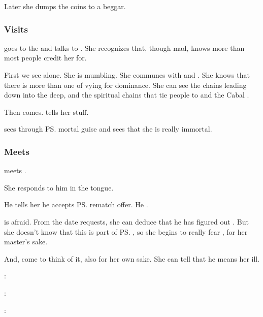 Later she dumps the coins to a beggar. 





\subsubsection{Visits \Uswa}
\Criseis{} goes to the  and talks to . 
She recognizes that, though mad, \Uswa{} knows more than most people credit her for. 

First we see \Uswa{} alone. 
She is mumbling. 
She communes with  and . 
She knows that there is more than one  of  vying for dominance. 
She can see the chains leading down into the deep, and the spiritual chains that tie people to \Nyx{} and the Cabal \Matrix. 

Then \Criseis{} comes. 
\Uswa{} tells her stuff. 

\Uswa{} sees through \ps{\Criseis} mortal guise and sees that she is really immortal. 





\subsubsection{Meets \Teshrial}
\Teshrial{} meets \Criseis. 

She responds to him in the \Resphan{} tongue. 

He tells her he accepts {\ps{\Ishnaruchaefir} rematch offer}. 
He . 

\Criseis{} is afraid. 
From the date \Teshrial{} requests, she can deduce that he has figured out . 
But she doesn't know that this is part of \ps{\Ishnaruchaefir} , so she begins to really fear \Teshrial, for her master's sake. 

And, come to think of it, also for her own sake.
She can tell that he means her ill. 

\begin{prose}
  \Criseis: 
  
  \Teshrial: 
  
  \Criseis: 
\end{prose}

